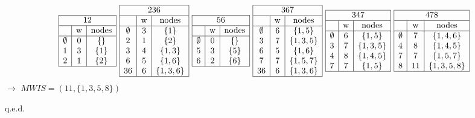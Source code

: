 \documentclass[a4paper,11pt,twoside]{scrartcl}
\newcommand{\qed}{%
	\begin{flushright}
		q.e.d.
	\end{flushright}%
	}
\begin{document}
\begin{align*}
\begin{array}{|c|c|c|}
\hline
\multicolumn{3}{|c|}{12}\\\hline
\text{ }&\text{w}&\text{nodes}\\\hline
\emptyset	& 0 & \{\}\\
1			& 3 & \{1\}\\
2			& 1 & \{2\}\\\hline
\end{array}~
\begin{array}{|c|c|c|}
\hline
\multicolumn{3}{|c|}{236}\\\hline
\text{ }&\text{w}&\text{nodes}\\\hline
\emptyset	& 3 & \{1\}\\
2			& 1 & \{2\}\\
3			& 4 & \{1,3\}\\
6			& 5 & \{1,6\}\\
36			& 6 & \{1,3,6\}\\\hline
\end{array}~
\begin{array}{|c|c|c|}
\hline
\multicolumn{3}{|c|}{56}\\\hline
\text{ }&\text{w}&\text{nodes}\\\hline
\emptyset	& 0 & \{\}\\
5			& 3 & \{5\}\\
6			& 2 & \{6\}\\\hline
\end{array}~
\begin{array}{|c|c|c|}
\hline
\multicolumn{3}{|c|}{367}\\\hline
\text{ }&\text{w}&\text{nodes}\\\hline
\emptyset	& 6 & \{1,5\}\\
3			& 7 & \{1,3,5\}\\
6			& 5 & \{1,6\}\\
7			& 7 & \{1,5,7\}\\
36			& 6 & \{1,3,6\}\\\hline
\end{array}~
\begin{array}{|c|c|c|}
\hline
\multicolumn{3}{|c|}{347}\\\hline
\text{ }&\text{w}&\text{nodes}\\\hline
\emptyset	& 6 & \{1,5\}\\
3			& 7 & \{1,3,5\}\\
4			& 8 & \{1,4,5\}\\
7			& 7 & \{1,5\}\\\hline
\end{array}~
\begin{array}{|c|c|c|}
\hline
\multicolumn{3}{|c|}{478}\\ \hline
\text{ }&\text{w}&\text{nodes}\\\hline
\emptyset	& 7 & \{1,4,6\}\\
4			& 8 & \{1,4,5\}\\
7			& 7 & \{1,5,7\}\\
8			& 11 & \{1,3,5,8\}\\\hline
\end{array}
\end{align*}
$\rightarrow$ $MWIS = \left( 11, \{1,3,5,8\} \right)$\qed
\end{document}
